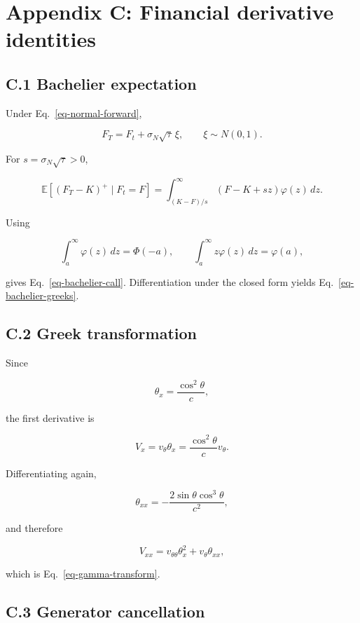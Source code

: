 \documentclass[
  english,
  10pt,
  letterpaper,
  DIV=11,
  numbers=noendperiod]{scrartcl}
\theoremstyle{definition}
\theoremstyle{plain}
\theoremstyle{plain}
\theoremstyle{remark}
\begin{document}
\section*{Appendix C: Financial derivative
identities}\label{sec-appendix-finance}

\subsection*{C.1 Bachelier expectation}\label{c.1-bachelier-expectation}

Under Eq.~\ref{eq-normal-forward},

\[
F_T=F_t+\sigma_N\sqrt\tau\,\xi,
\qquad \xi\sim N(0,1).
\]

For \(s=\sigma_N\sqrt\tau>0\),

\[
\mathbb E[(F_T-K)^+\mid F_t=F]
=
\int_{(K-F)/s}^\infty(F-K+sz)\varphi(z)\,dz.
\]

Using

\[
\int_a^\infty\varphi(z)\,dz=\Phi(-a),
\qquad
\int_a^\infty z\varphi(z)\,dz=\varphi(a),
\]

gives Eq.~\ref{eq-bachelier-call}. Differentiation under the closed form
yields Eq.~\ref{eq-bachelier-greeks}.

\subsection*{C.2 Greek transformation}\label{c.2-greek-transformation}

Since

\[
\theta_x=\frac{\cos^2\theta}{c},
\]

the first derivative is

\[
V_x=v_\theta\theta_x
=\frac{\cos^2\theta}{c}v_\theta.
\]

Differentiating again,

\[
\theta_{xx}
=-\frac{2\sin\theta\cos^3\theta}{c^2},
\]

and therefore

\[
V_{xx}
=v_{\theta\theta}\theta_x^2+v_\theta\theta_{xx},
\]

which is Eq.~\ref{eq-gamma-transform}.

\subsection*{C.3 Generator
cancellation}\label{c.3-generator-cancellation}
\end{document}
